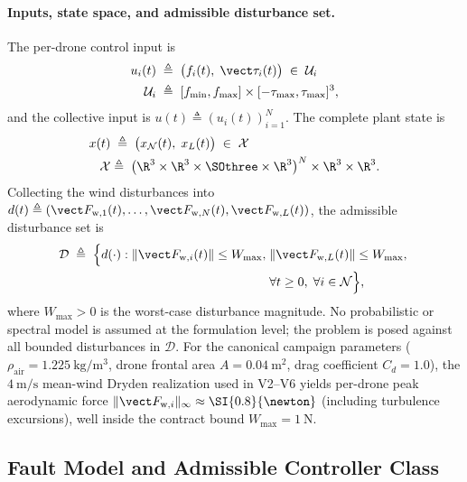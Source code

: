 \paragraph{Inputs, state space, and admissible disturbance set.} The per-drone control input is
\begin{align}
\label{eq:input-set}
 u_i(t) &\;\triangleq\; \bigl(f_i(t),\; \vect\tau_i(t)\bigr)
    \;\in\; \mathcal{U}_i\\
    \mathcal{U}_i &\;\triangleq\;
      [f_{\min}, f_{\max}] \times [-\tau_{\max}, \tau_{\max}]^3,\nonumber
\end{align}
and the collective input is $u(t) \triangleq (u_i(t))_{i=1}^N$. The complete plant state is
\begin{align}
\label{eq:plant-state}
 x(t) &\;\triangleq\; \bigl(x_{\mathcal{N}}(t),\; x_L(t)\bigr)
    \;\in\; \mathcal{X} \\
    \mathcal{X} &\triangleq\;
    \bigl(\R^3 \times \R^3 \times \SOthree \times \R^3\bigr)^N
    \times \R^3 \times \R^3.\nonumber
\end{align}
Collecting the wind disturbances into $d(t) \triangleq (\vect F_{\mathrm{w},1}(t), \dots, \vect F_{\mathrm{w},N}(t), \vect F_{\mathrm{w},L}(t))$, the admissible disturbance set is
\begin{align}
\label{eq:disturbance-set}
  \mathcal{D} \;\triangleq\;
    \Bigl\{ d(\cdot) :
      \|\vect F_{\mathrm{w},i}(t)\| \le W_{\max},\;
      &\|\vect F_{\mathrm{w},L}(t)\| \le W_{\max},\;\\
      &\forall t \ge 0,\; \forall i \in \mathcal{N}
    \Bigr\},\nonumber
\end{align}
where $W_{\max} > 0$ is the worst-case disturbance magnitude. No probabilistic or spectral model is assumed at the formulation level; the problem is posed against all bounded disturbances in $\mathcal{D}$. For the canonical campaign parameters ($\rho_{\mathrm{air}} = \SI{1.225}{\kilogram\per\metre\cubed}$, drone frontal area $A = \SI{0.04}{\metre\squared}$, drag coefficient $C_d = 1.0$), the $\SI{4}{\metre\per\second}$ mean-wind Dryden realization used in V2--V6 yields per-drone peak aerodynamic force $\|\vect F_{\mathrm{w}, i}\|_\infty \approx \SI{0.8}{\newton}$ (including turbulence excursions), well inside the contract bound $W_{\max} = \SI{1}{\newton}$.



\subsection{Fault Model and Admissible Controller Class}
\label{sec:fault-and-controller}

